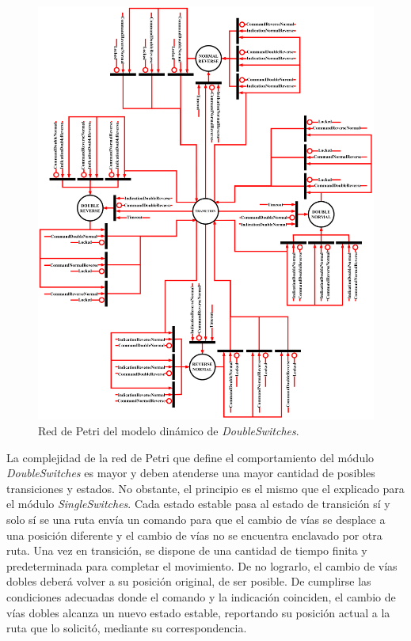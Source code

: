 \begin{figure}[H]
	\centering
	\includegraphics[width=1\textwidth]{Figuras/DSW_petri}
	\centering\caption{Red de Petri del modelo dinámico de \textit{DoubleSwitches}.}
	\label{fig:DSW_Petri}
\end{figure}

La complejidad de la red de Petri que define el comportamiento del módulo \textit{DoubleSwitches} es mayor y deben atenderse una mayor cantidad de posibles transiciones y estados. No obstante, el principio es el mismo que el explicado para el módulo \textit{SingleSwitches}. Cada estado estable pasa al estado de transición sí y solo sí se una ruta envía un comando para que el cambio de vías se desplace a una posición diferente y el cambio de vías no se encuentra enclavado por otra ruta. Una vez en transición, se dispone de una cantidad de tiempo finita y predeterminada para completar el movimiento. De no lograrlo, el cambio de vías dobles deberá volver a su posición original, de ser posible. De cumplirse las condiciones adecuadas donde el comando y la indicación coinciden, el cambio de vías dobles alcanza un nuevo estado estable, reportando su posición actual a la ruta que lo solicitó, mediante su correspondencia.
